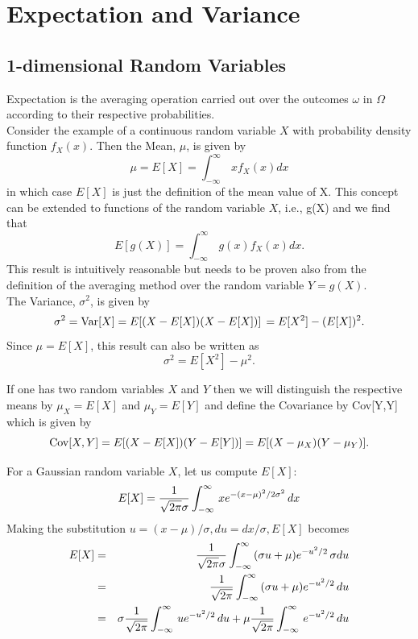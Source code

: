 \section{Expectation and Variance}
\subsection{1-dimensional Random Variables}
Expectation is the averaging operation carried out over the outcomes $\omega$ in $\Omega$ according to their respective probabilities.\\

Consider the example of a continuous random variable $X$ with probability density function $f_X(x)$. Then the {\elevenit Mean}, $\mu$, is given by $$\mu = E[X] = \int_{-\infty}^{\infty}\, x f_X(x) dx$$ in which case $E[X]$ is just the definition of the mean value of X. This concept can be extended to functions of the random variable $X$, i.e., g(X) and we find that $$E[g(X)] = \int_{-\infty}^{\infty}\, g(x) f_X(x) dx.$$ This result is intuitively reasonable but needs to be proven also from the definition of the averaging method over the random variable $Y = g(X)$.\\

The {\elevenit Variance}, $\sigma^2$, is given by  $$\sigma^2 = \hbox{Var}[X] = E[(X - E[X])(X- E[X])]\, = E[X^2] - (E[X])^2.$$ Since $\mu = E[X]$, this result can also be written as $$\sigma^2 = E[X^2] - \mu^2.$$

If one has two random variables $X$ and $Y$ then we will distinguish the respective means by $\mu_X = E[X]$ and $\mu_Y = E[Y]$ and define the {\elevenit Covariance} by Cov[Y,Y] which is given by 
$$\hbox{Cov}[X,Y] = E[(X-E[X])(Y-E[Y])] = E[(X - \mu_X)(Y-\mu_Y)].$$

For a Gaussian random variable $X$, let us compute $E[X]$: 
$$E[X] = {1\over \sqrt{2\pi}\sigma} \int_{-\infty}^{\infty}\, x e^{-(x-\mu)^2/2\sigma^2}\, dx$$
Making the substitution $u = (x -\mu)/\sigma, du = dx/\sigma, E[X]$ becomes 
\begin{eqnarray*} E[X] &=& {1\over \sqrt{2\pi}\sigma} \int_{-\infty}^{\infty}\, (\sigma u + \mu) e^{-u^2/2}\, \sigma du \\
      &=& {1\over \sqrt{2\pi}} \int_{-\infty}^{\infty}\, (\sigma u + \mu) e^{-u^2/2}\, du\\
      &=& \sigma {1\over \sqrt{2\pi}} \int_{-\infty}^{\infty}\, u e^{-u^2/2}\, du + \mu {1\over \sqrt{2\pi}} \int_{-\infty}^{\infty}\, e^{-u^2/2}\, du\\
\end{eqnarray*}

